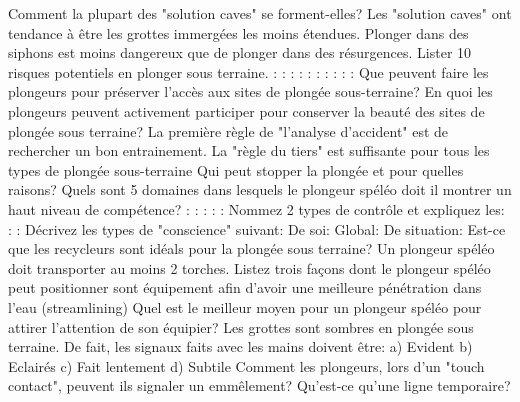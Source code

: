 \documentclass[english,10pt,a4paper]{article}
\begin{document}
	\begin{outline}
		\1 Comment la plupart des "solution caves" se forment-elles?
			\vspace{2cm}
		\1 Les "solution caves" ont tendance à être les grottes immergées les moins étendues.
			\vf
		\1 Plonger dans des siphons est moins dangereux que de plonger dans des résurgences.
			\vf
		\1 Lister 10 risques potentiels en plonger sous terraine.
			:
			:
			:
			:
			:
			:
			:
			:
			:
			:
		\1 Que peuvent faire les plongeurs pour préserver l’accès aux sites de plongée sous-terraine?
			\vspace{2cm}
		\1 En quoi les plongeurs peuvent activement participer pour conserver la beauté des sites de plongée sous terraine?
			\vspace{2cm}
		\1 La première règle de "l’analyse d’accident" est de rechercher un bon entrainement.
			\vf
		\1 La "règle du tiers" est suffisante pour tous les types de plongée sous-terraine
			\vf
		\1 Qui peut stopper la plongée et pour quelles raisons?
			\vspace{2cm}
		\1 Quels sont 5 domaines dans lesquels le plongeur spéléo doit il montrer un haut niveau de compétence?
			:
			:
			:
			:
			:
		\1 Nommez 2 types de contrôle et expliquez les:
			: \vspace{2cm}
			: \vspace{2cm}
		\1 Décrivez les types de "conscience" suivant:
			\2 De soi:	\vspace{2cm}
			\2 Global:	\vspace{2cm}
			\2 De situation:	\vspace{2cm}
		\1 Est-ce que les recycleurs sont idéals pour la plongée sous terraine?
			\2
		\1 Un plongeur spéléo doit transporter au moins 2 torches.
			\vf
		\1 Listez trois façons dont le plongeur spéléo peut positionner sont équipement afin d’avoir une meilleure pénétration dans l’eau (streamlining)
			\2	\2	\2
		\1 Quel est le meilleur moyen pour un plongeur spéléo pour attirer l’attention de son équipier?
			\vspace{2cm}
		\1 Les grottes sont sombres en plongée sous terraine. De fait, les signaux faits avec les mains doivent être:
			\2 a) Evident
			\2 b) Eclairés
			\2 c) Fait lentement
			\2 d) Subtile
		\1 Comment les plongeurs, lors d’un "touch contact", peuvent ils signaler un emmêlement?
			\vspace{2cm}
		\1 Qu’est-ce qu’une ligne temporaire?
			\vspace{2cm}

\end{outline}
\end{document}
